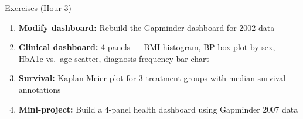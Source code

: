 \documentclass[aspectratio=169,11pt]{beamer}
\begin{document}
\begin{frame}{Exercises (Hour 3)}
\begin{enumerate}
  \item \textbf{Modify dashboard:} Rebuild the Gapminder dashboard for 2002 data
  \item \textbf{Clinical dashboard:} 4 panels --- BMI histogram, BP box plot by sex, HbA1c vs.\ age scatter, diagnosis frequency bar chart
  \item \textbf{Survival:} Kaplan-Meier plot for 3 treatment groups with median survival annotations
  \item \textbf{Mini-project:} Build a 4-panel health dashboard using Gapminder 2007 data
\end{enumerate}
\end{frame}
\end{document}
